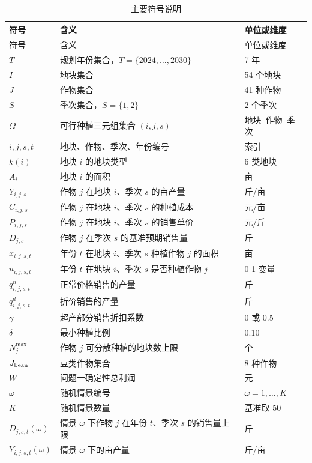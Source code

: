 \begin{longtable}{p{}p{}p{}}
\caption{主要符号说明}\label{tab:symbols}\\
\toprule
符号 & 含义 & 单位或维度 \\
\midrule
\endfirsthead
\toprule
符号 & 含义 & 单位或维度 \\
\midrule
\endhead
$T$ & 规划年份集合，$T=\{2024,\ldots,2030\}$ & 7 年 \\
$I$ & 地块集合 & 54 个地块 \\
$J$ & 作物集合 & 41 种作物 \\
$S$ & 季次集合，$S=\{1,2\}$ & 2 个季次 \\
$\Omega$ & 可行种植三元组集合 $(i,j,s)$ & 地块--作物--季次 \\
$i,j,s,t$ & 地块、作物、季次、年份编号 & 索引 \\
$k(i)$ & 地块 $i$ 的地块类型 & 6 类地块 \\
$A_i$ & 地块 $i$ 的面积 & 亩 \\
$Y_{i,j,s}$ & 作物 $j$ 在地块 $i$、季次 $s$ 的亩产量 & 斤/亩 \\
$C_{i,j,s}$ & 作物 $j$ 在地块 $i$、季次 $s$ 的种植成本 & 元/亩 \\
$P_{i,j,s}$ & 作物 $j$ 在地块 $i$、季次 $s$ 的销售单价 & 元/斤 \\
$D_{j,s}$ & 作物 $j$ 在季次 $s$ 的基准预期销售量 & 斤 \\
$x_{i,j,s,t}$ & 年份 $t$ 在地块 $i$、季次 $s$ 种植作物 $j$ 的面积 & 亩 \\
$u_{i,j,s,t}$ & 年份 $t$ 在地块 $i$、季次 $s$ 是否种植作物 $j$ & 0-1 变量 \\
$q^n_{i,j,s,t}$ & 正常价格销售的产量 & 斤 \\
$q^d_{i,j,s,t}$ & 折价销售的产量 & 斤 \\
$\gamma$ & 超产部分销售折扣系数 & 0 或 0.5 \\
$\delta$ & 最小种植比例 & 0.10 \\
$N_j^{\max}$ & 作物 $j$ 可分散种植的地块数上限 & 个 \\
$J_{\rm bean}$ & 豆类作物集合 & 8 种作物 \\
$W$ & 问题一确定性总利润 & 元 \\
$\omega$ & 随机情景编号 & $\omega=1,\ldots,K$ \\
$K$ & 随机情景数量 & 基准取 50 \\
$D_{j,s,t}(\omega)$ & 情景 $\omega$ 下作物 $j$ 在年份 $t$、季次 $s$ 的销售量上限 & 斤 \\
$Y_{i,j,s,t}(\omega)$ & 情景 $\omega$ 下的亩产量 & 斤/亩 \\

\end{longtable}
